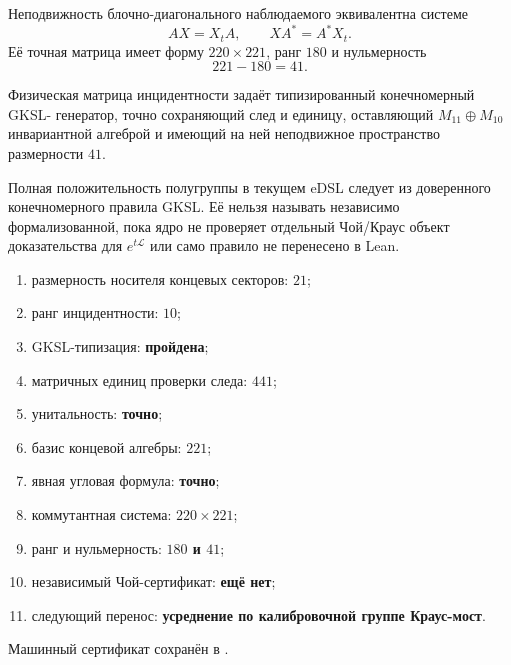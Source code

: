 Неподвижность блочно-диагонального наблюдаемого эквивалентна системе
\begin{equation}
 AX=X_tA,
 \qquad
 XA^*=A^*X_t.
\end{equation}
Её точная матрица имеет форму $220\times221$, ранг $180$ и нульмерность
\begin{equation}
 221-180=41.
 \label{eq:v8-lcf-linking-fixed-forty-one}
\end{equation}

\begin{theorem}
Физическая матрица инцидентности задаёт типизированный конечномерный GKSL-
генератор, точно сохраняющий след и единицу, оставляющий
$M_{11}\oplus M_{10}$ инвариантной алгеброй и имеющий на ней неподвижное
пространство размерности $41$.
\end{theorem}

\begin{nogocriterion}
Полная положительность полугруппы в текущем eDSL следует из доверенного
конечномерного правила GKSL. Её нельзя называть независимо формализованной,
пока ядро не проверяет отдельный Чой/Краус объект доказательства для $e^{t\mathcal L}$
или само правило не перенесено в Lean.
\end{nogocriterion}

\begin{protocol}
\begin{enumerate}
 \item размерность носителя концевых секторов: \textbf{$21$};
 \item ранг инцидентности: \textbf{$10$};
 \item GKSL-типизация: \textbf{пройдена};
 \item матричных единиц проверки следа: \textbf{$441$};
 \item унитальность: \textbf{точно};
 \item базис концевой алгебры: \textbf{$221$};
 \item явная угловая формула: \textbf{точно};
 \item коммутантная система: \textbf{$220\times221$};
 \item ранг и нульмерность: \textbf{$180$ и $41$};
 \item независимый Чой-сертификат: \textbf{ещё нет};
 \item следующий перенос: \textbf{усреднение по калибровочной группе Краус-мост}.
\end{enumerate}
\end{protocol}

Машинный сертификат сохранён в
.